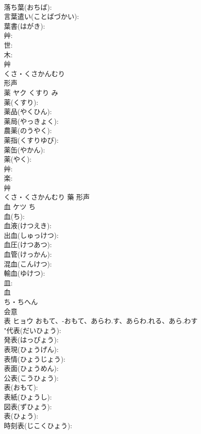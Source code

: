 \documentclass[8pt]{extreport}
\begin{document}
\begin{CJK}{UTF8}{min}
\\	落ち葉(おちば): 
\\	言葉遣い(ことばづかい): 
\\	葉書(はがき): 
\\	艸: 
\\	世: 
\\	木: 
\\	艸	
\\	くさ・くさかんむり	
\\	形声 
\\	薬	ヤク	くすり	み	
\\	薬(くすり): 
\\	薬品(やくひん): 
\\	薬局(やっきょく): 
\\	農薬(のうやく): 
\\	薬指(くすりゆび): 
\\	薬缶(やかん): 
\\	薬(やく): 
\\	艸: 
\\	楽: 
\\	艸	
\\	くさ・くさかんむり	藥	形声 
\\	血	ケツ	ち		
\\	血(ち): 
\\	血液(けつえき): 
\\	出血(しゅっけつ): 
\\	血圧(けつあつ): 
\\	血管(けっかん): 
\\	混血(こんけつ): 
\\	輸血(ゆけつ): 
\\	皿: 
\\	血	
\\	ち・ちへん	
\\	会意 
\\	表	ヒョウ	おもて、-おもて、あらわ.す、あらわ.れる、あら.わす		
\\	"代表(だいひょう): 
\\	発表(はっぴょう): 
\\	表現(ひょうげん): 
\\	表情(ひょうじょう): 
\\	表面(ひょうめん): 
\\	公表(こうひょう): 
\\	表(おもて): 
\\	表紙(ひょうし): 
\\	図表(ずひょう): 
\\	表(ひょう): 
\\	時刻表(じこくひょう): 

\end{CJK}
\end{document}

